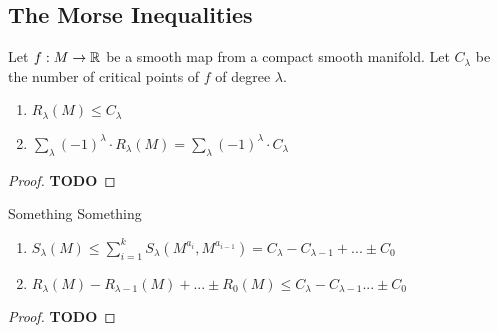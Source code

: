 \documentclass[a4paper,11pt]{article}
\begin{document}
\subsection{The Morse Inequalities}

\begin{lemma}
   \label{lemma:weak morse inequalities}
   Let $f: M \rightarrow {\mathbb R}$ be a smooth map from a compact smooth manifold. Let $C_{\lambda}$
   be the number of critical points of $f$ of degree $\lambda$.
   \begin{enumerate}
      \item $R_{\lambda} (M) \leq C_{\lambda}$
      \item $\sum_{\lambda} (-1)^{\lambda} \cdot R_{\lambda}(M) = \sum_{\lambda} (-1)^{\lambda} \cdot C_{\lambda} $
   \end{enumerate}
\end{lemma}

\begin{proof}
   \textbf{TODO}
\end{proof}

\begin{lemma}
   \label{lemma:strung morse inequalities}
   Something Something
   \begin{enumerate}
      \item $ S_{\lambda}(M) \leq \sum_{i = 1}^k S_{\lambda}(M^{a_i}, M^{a_{i-1}}) = C_{\lambda} - C_{\lambda - 1} + ... \pm C_0 $
      \item $ R_{\lambda}(M) - R_{\lambda - 1}(M) + ... \pm R_0(M) \leq C_{\lambda} - C_{\lambda - 1} ... \pm C_0 $
   \end{enumerate}
\end{lemma}

\begin{proof}
   \textbf{TODO}
\end{proof}

\end{document}
